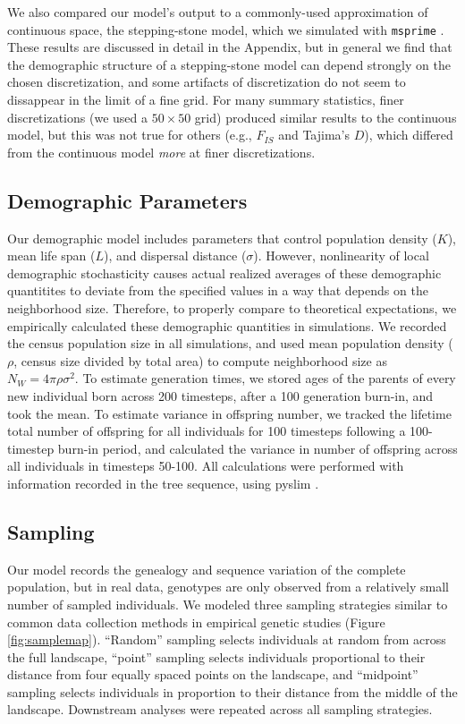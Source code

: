 \documentclass[10pt,twoside,lineno,hidelinks]{preprint}
\begin{document}
We also compared our model's output to a commonly-used approximation of continuous space,
the stepping-stone model, which we simulated with \texttt{msprime} \citep{Kelleher2016}.
These results are discussed in detail in the Appendix,
but in general we find that the demographic structure of a stepping-stone model
can depend strongly on the chosen discretization,
and some artifacts of discretization do not seem to dissappear in the limit of a fine grid.
For many summary statistics, finer discretizations (we used a $50 \times 50$ grid)
produced similar results to the continuous model,
but this was not true for others (e.g., $F_{IS}$ and Tajima's $D$),
which differed from the continuous model \emph{more} at finer discretizations.

\subsection{Demographic Parameters}

Our demographic model includes parameters that control population density ($K$), 
mean life span ($L$), and dispersal distance ($\sigma$).
However, nonlinearity of local demographic stochasticity causes
actual realized averages of these demographic quantitites to deviate from the specified values
in a way that depends on the neighborhood size.
Therefore, to properly compare to theoretical expectations,
we empirically calculated these demographic quantities in simulations. 
We recorded the census population size in all simulations,
and used mean population density ($\rho$, census size divided by total area)
to compute neighborhood size as $N_W = 4 \pi \rho \sigma^2$. 
To estimate generation times, we stored ages of the parents of every new individual born across 200 timesteps, 
after a 100 generation burn-in, and took the mean. 
To estimate variance in offspring number, 
we tracked the lifetime total number of offspring for all individuals for 100 timesteps following a 100-timestep burn-in period,
and calculated the variance in number of offspring across all individuals in timesteps 50-100.
All calculations were performed with information recorded in the tree sequence,
using pyslim \citep{pyslim}.

\subsection{Sampling}
Our model records the genealogy and sequence variation of the complete population, but in real data, genotypes are only observed from a relatively small number of sampled individuals. We modeled three sampling strategies similar to common data collection methods in empirical genetic studies (Figure \ref{fig:samplemap}). ``Random'' sampling selects individuals at random from across the full landscape, ``point'' sampling selects individuals proportional to their distance from four equally spaced points on the landscape, and ``midpoint'' sampling selects individuals in proportion to their distance from the middle of the landscape. Downstream analyses were repeated across all sampling strategies. 
\end{document}

